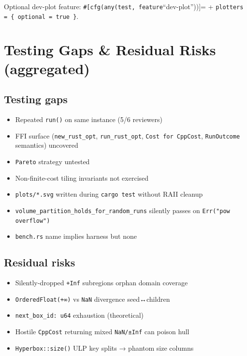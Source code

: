 \documentclass[11pt]{article}
\begin{document}
Optional dev-plot feature: \texttt{\#[cfg(any(test, feature}``dev-plot''))]= + \texttt{plotters = \{ optional = true \}}.
\section{Testing Gaps \& Residual Risks (aggregated)}
\label{sec:org2e6ced2}

\subsection{Testing gaps}
\label{sec:orgb2b3174}
\begin{itemize}
\item Repeated \texttt{run()} on same instance (5/6 reviewers)
\item FFI surface (\texttt{new\_rust\_opt}, \texttt{run\_rust\_opt}, \texttt{Cost for CppCost}, \texttt{RunOutcome} semantics) uncovered
\item \texttt{Pareto} strategy untested
\item Non-finite-cost tiling invariants not exercised
\item \texttt{plots/*.svg} written during \texttt{cargo test} without RAII cleanup
\item \texttt{volume\_partition\_holds\_for\_random\_runs} silently passes on \texttt{Err("pow overflow")}
\item \texttt{bench.rs} name implies harness but none
\end{itemize}
\subsection{Residual risks}
\label{sec:org1544025}
\begin{itemize}
\item Silently-dropped \texttt{+Inf} subregions orphan domain coverage
\item \texttt{OrderedFloat(+∞)} vs \texttt{NaN} divergence seed↔children
\item \texttt{next\_box\_id: u64} exhaustion (theoretical)
\item Hostile \texttt{CppCost} returning mixed \texttt{NaN/±Inf} can poison hull
\item \texttt{Hyperbox::size()} ULP key splits → phantom size columns
\end{itemize}
\end{document}
